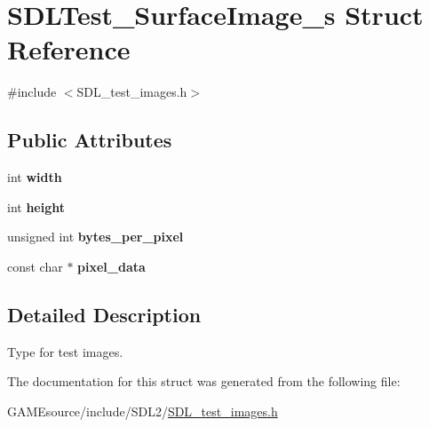 \hypertarget{struct_s_d_l_test___surface_image__s}{}\section{S\+D\+L\+Test\+\_\+\+Surface\+Image\+\_\+s Struct Reference}
\label{struct_s_d_l_test___surface_image__s}


{\ttfamily \#include $<$S\+D\+L\+\_\+test\+\_\+images.\+h$>$}

\subsection*{Public Attributes}
\begin{DoxyCompactItemize}
\item 
\mbox{\label{struct_s_d_l_test___surface_image__s_a3cbacf6b015a22832ab4d3f509719609}} 
int {\bfseries width}
\item 
\mbox{\label{struct_s_d_l_test___surface_image__s_a310092874695556e4b7f1f63aec24213}} 
int {\bfseries height}
\item 
\mbox{\label{struct_s_d_l_test___surface_image__s_a2daf91bab3d79fb9dfa25e8ade43e606}} 
unsigned int {\bfseries bytes\+\_\+per\+\_\+pixel}
\item 
\mbox{\label{struct_s_d_l_test___surface_image__s_acf2d3006bea5690f564d3003d1512fa7}} 
const char $\ast$ {\bfseries pixel\+\_\+data}
\end{DoxyCompactItemize}


\subsection{Detailed Description}
Type for test images. 

The documentation for this struct was generated from the following file\+:\begin{DoxyCompactItemize}
\item 
G\+A\+M\+Esource/include/\+S\+D\+L2/\mbox{\hyperlink{_s_d_l__test__images_8h}{S\+D\+L\+\_\+test\+\_\+images.\+h}}\end{DoxyCompactItemize}
